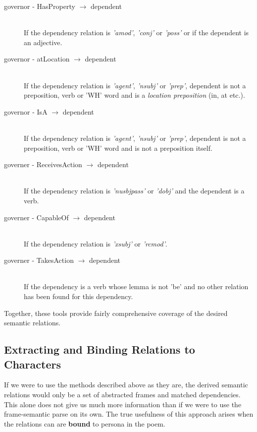 \begin{description}
\item[governor - HasProperty $\rightarrow$ dependent]  \hfill \\
If the dependency relation is \textit{'amod'}, \textit{'conj'} or \textit{'poss'} or if the dependent is an adjective.

\item[governor - atLocation $\rightarrow$ dependent] \hfill \\
If the dependency relation is \textit{'agent'}, \textit{'nsubj'} or \textit{'prep'}, dependent is not a preposition, verb or 'WH' word and is a \textit{location preposition} (in, at etc.).
	
\item[governor - IsA $\rightarrow$ dependent] \hfill \\
If the dependency relation is \textit{'agent'}, \textit{'nsubj'} or \textit{'prep'}, dependent is not a preposition, verb or 'WH' word and is not a preposition itself.
	
\item[governer - ReceivesAction $\rightarrow$ dependent] \hfill \\
If the dependency relation is \textit{'nusbjpass'} or \textit{'dobj'} and the dependent is a verb.

\item[governer - CapableOf $\rightarrow$ dependent] \hfill \\
If the dependency relation is \textit{'xsubj'} or \textit{'rcmod'}.

\item[governer - TakesAction $\rightarrow$ dependent] \hfill \\
If the dependency is a verb whose lemma is not 'be' and no other relation has been found for this dependency.
\end{description}

Together, these tools provide fairly comprehensive coverage of the desired semantic relations.


\subsection{Extracting and Binding Relations to Characters}

If we were to use the methods described above as they are, the derived semantic relations would only be a set of abstracted frames and matched dependencies. This alone does not give us much more information than if we were to use the frame-semantic parse on its own. The true usefulness of this approach arises when the relations can are \textbf{bound} to persona in the poem. 

